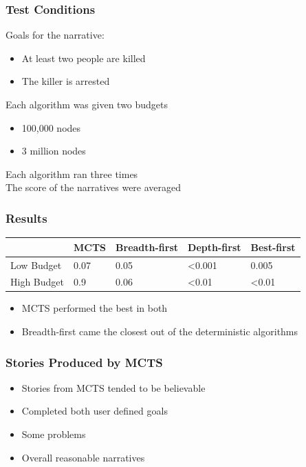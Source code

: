 \documentclass{beamer}
\begin{document}

\begin{frame}
\frametitle{Test Conditions}
Goals for the narrative:
\begin{itemize}
	\item At least two people are killed
	\item The killer is arrested
\end{itemize}
Each algorithm was given two budgets
\begin{itemize}
	\item 100,000 nodes
	\item 3 million nodes
\end{itemize}
Each algorithm ran three times \\
The score of the narratives were averaged
\end{frame}

\begin{frame}[fragile]
\frametitle{Results}
\begin{table}[h]
	\centering
	\begin{tabular}{ m{0.55in} | m{0.55in} | m{0.55in} | m{0.55in} | m{0.55in} |}	 
	 & MCTS & Breadth-first & Depth-first & Best-first \\ \hline
Low Budget & 0.07 & 0.05 & <0.001 & 0.005 \\ \hline
High Budget & 0.9 & 0.06 & <0.01 & <0.01 \\ \hline
	\end{tabular}
\end{table}
\begin{itemize}
	\item MCTS performed the best in both
	\item Breadth-first came the closest out of the deterministic algorithms
\end{itemize}
\end{frame}

\begin{frame}
\frametitle{Stories Produced by MCTS}
\begin{itemize}
	\item Stories from MCTS tended to be believable
	\item Completed both user defined goals
	\item Some problems
	\item Overall reasonable narratives
\end{itemize}
\end{frame}
\end{document}
